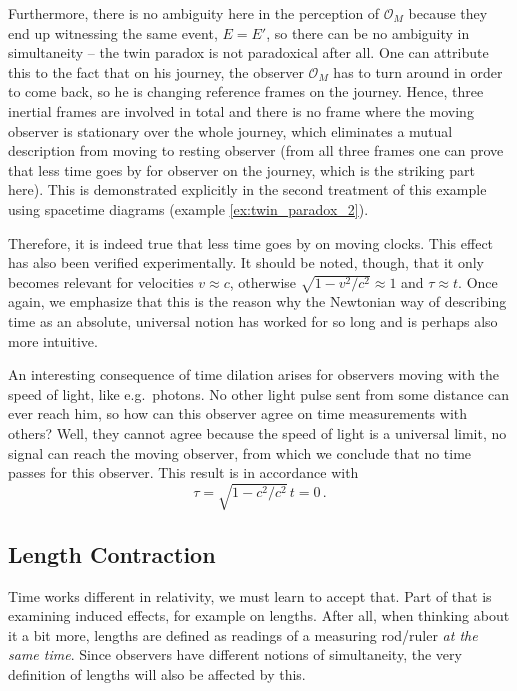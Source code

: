 \documentclass[../relativity_main.tex]{subfiles}
\begin{document}
\begin{ex}
	Furthermore, there is no ambiguity here in the perception of $\mathcal{O}_M$ because they end up witnessing the same event, $E = E'$, so there can be no ambiguity in simultaneity -- the twin paradox is not paradoxical after all. One can attribute this to the fact that on his journey, the observer $\mathcal{O}_M$ has to turn around in order to come back, so he is changing reference frames on the journey. Hence, three inertial frames are involved in total and there is no frame where the moving observer is stationary over the whole journey, which eliminates a mutual description from moving to resting observer (from all three frames one can prove that less time goes by for observer on the journey, which is the striking part here). This is demonstrated explicitly in the second treatment of this example using spacetime diagrams (example \ref{ex:twin_paradox_2}).
\end{ex}
Therefore, it is indeed true that less time goes by on moving clocks. This effect has also been verified experimentally.  It should be noted, though, that it only becomes relevant for velocities $v \approx c$, otherwise $\sqrt{1 - v^2 / c^2} \approx 1$ and $\tau \approx t$. Once again, we emphasize that this is the reason why the Newtonian way of describing time as an absolute, universal notion has worked for so long and is perhaps also more intuitive.


An interesting consequence of time dilation arises for observers moving with the speed of light, like e.g.~photons. No other light pulse sent from some distance can ever reach him, so how can this observer agree on time measurements with others? Well, they cannot agree because the speed of light is a universal limit, no signal can reach the moving observer, from which we conclude that no time passes for this observer. This result is in accordance with
\begin{equation}
	\tau = \sqrt{1 - c^2 / c^2} \, t = 0 \, .
\end{equation}



		\subsection{Length Contraction}
Time works different in relativity, we must learn to accept that. Part of that is examining induced effects, for example on lengths. After all, when thinking about it a bit more, lengths are defined as readings of a measuring rod/ruler \emph{at the same time}. Since observers have different notions of simultaneity, the very definition of lengths will also be affected by this.
\end{document}
